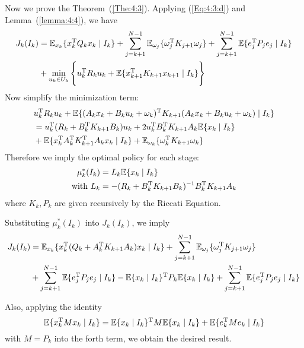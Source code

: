 Now we prove the Theorem~(\ref{The:4:3}).
Applying (\ref{Eq:4:3:d}) and Lemma~(\ref{lemma:4:4}), we have
\begin{equation}
\begin{aligned}
J_k(I_k)&=\mathbb{E}_{x_k}\{x_k^{\mathrm T} Q_kx_k\mid I_k\}
+
\sum_{j=k+1}^{N-1}\mathbb{E}_{\omega_j}\{\omega_j^{\mathrm T} K_{j+1}\omega_j\}+\sum_{j=k+1}^{N-1}\mathbb{E}\{e_j^{\mathrm T} P_je_j\mid I_k\}\\
&+\min_{u_k\in U_k}
\Bigg\{
u_k^{\mathrm T} R_ku_k
+
\mathbb{E}\{x_{k+1}^{\mathrm T} K_{k+1}x_{k+1}\mid I_k\}
\Bigg\}
\end{aligned}
\end{equation}
Now simplify the minimization term:
\begin{align*}
&u_k^{\mathrm T} R_ku_k
+
\mathbb{E}\{(A_kx_k+B_ku_k+\omega_k)^{\mathrm T} K_{k+1}(A_kx_k+B_ku_k+\omega_k)\mid I_k\}\\
&=
u_k^{\mathrm T}(R_k+B_k^{\mathrm T} K_{k+1}B_k)u_k
+
2u_k^{\mathrm T} B_k^{\mathrm T} K_{k+1}A_k\mathbb{E}\{x_k\mid I_k\}\\
&+\mathbb{E}\{x_k^{\mathrm T} A_k^{\mathrm T} K_{k+1}^{\mathrm T} A_kx_k\mid I_k\}
+
\mathbb{E}_{\omega_k}\{\omega_k^{\mathrm T} K_{k+1}\omega_k\}
\end{align*}
Therefore we imply the optimal policy for each stage:
\begin{align*}
\mu_k^*(I_k)&=L_k\mathbb{E}\{x_k\mid I_k\}\\
\text{with}\ L_k&=-(R_k+B_k^{\mathrm T} K_{k+1}B_k)^{-1}B_k^{\mathrm T} K_{k+1}A_k
\end{align*}
where $K_k,P_k$ are given recursively by the Riccati Equation.

Substituting $\mu_k^*(I_k)$ into $J_k(I_k)$, we imply
\begin{align*}
J_k(I_k)&=\mathbb{E}_{x_k}\{x_k^{\mathrm T} (Q_k+A_k^{\mathrm T} K_{k+1}A_k)x_k\mid I_k\}+\sum_{j=k+1}^{N-1}\mathbb{E}_{\omega_j}\{\omega_j^{\mathrm T} K_{j+1}\omega_j\}\\&
+\sum_{j=k+1}^{N-1}\mathbb{E}\{e_j^{\mathrm T} P_je_j\mid I_k\}-
\mathbb{E}\{x_k\mid I_k\}^{\mathrm T} P_k\mathbb{E}\{x_k\mid I_k\}
+
\sum_{j=k+1}^{N-1}\mathbb{E}\{e_j^{\mathrm T} P_je_j\mid I_k\}
\end{align*}

Also, applying the identity
\begin{equation}
\mathbb{E}\{x_k^{\mathrm T} Mx_k\mid I_k\}
=
\mathbb{E}\{x_k\mid I_k\}^{\mathrm T} M\mathbb{E}\{x_k\mid I_k\}
+
\mathbb{E}\{e_k^{\mathrm T} Me_k\mid I_k\}
\end{equation}
with $M=P_k$ into the forth term, we obtain the desired result.



